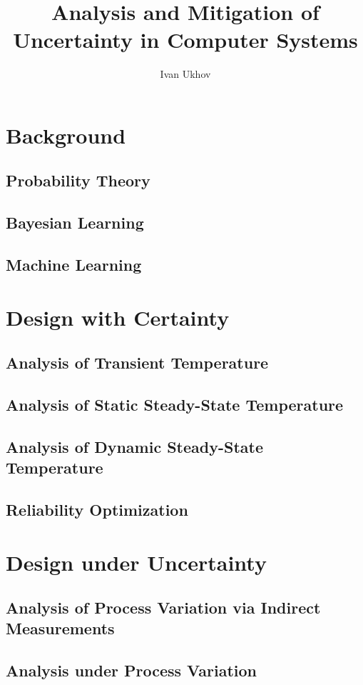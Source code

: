 \documentclass[english]{style}
\title{
  Analysis and Mitigation of\\[0.3em]
  Uncertainty in Computer Systems
}
\author{Ivan Ukhov}
\begin{document}
\nocite{ukhov2012, ukhov2014a, ukhov2014b, ukhov2015, ukhov2017}



\chapter{Background}
\section{Probability Theory}
\section{Bayesian Learning}
\section{Machine Learning}

\chapter{Design with Certainty}
\section{Analysis of Transient Temperature}
\section{Analysis of Static Steady-State Temperature}
\section{Analysis of Dynamic Steady-State Temperature}
\section{Reliability Optimization}

\chapter{Design under Uncertainty}
\section{Analysis of Process Variation via Indirect Measurements}
\section{Analysis under Process Variation}
\end{document}
